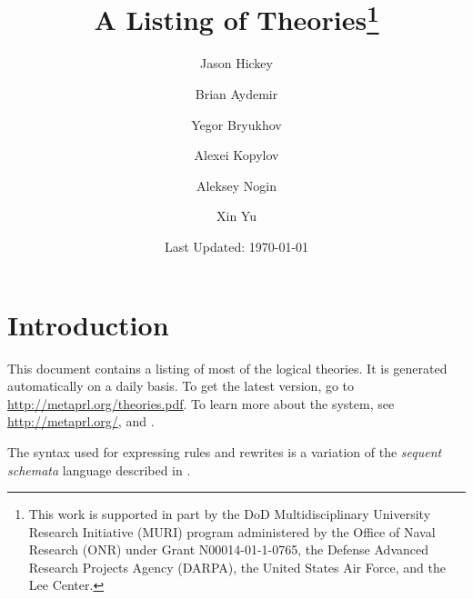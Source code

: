 \documentclass{report}
\begin{document}
\author{Jason Hickey\and Brian Aydemir\and Yegor Bryukhov\and Alexei
Kopylov\and Aleksey Nogin\and Xin Yu}
\title{A Listing of \MetaPRL{} Theories\thanks{This work is supported in part
by the DoD Multidisciplinary University Research Initiative (MURI) program
administered by the Office of Naval Research (ONR) under Grant
N00014-01-1-0765, the Defense Advanced Research Projects Agency (DARPA), the
United States Air Force, and the Lee Center.}}
\date{Last Updated: \today}
\maketitle
\chapter{Introduction}
This document contains a listing of most of the \MetaPRL{}
logical theories. It is generated automatically on a daily basis. To get the
latest version, go to \url{http://metaprl.org/theories.pdf}. To learn more
about the \MetaPRL{} system, see \url{http://metaprl.org/}, \cite{Hic01} and
\cite{Nog02c}.

The syntax used for expressing \MetaPRL{} rules and rewrites is a variation of the
\emph{sequent schemata} language described in \cite{NH02}.

\sloppy


\printindex



\end{document}
